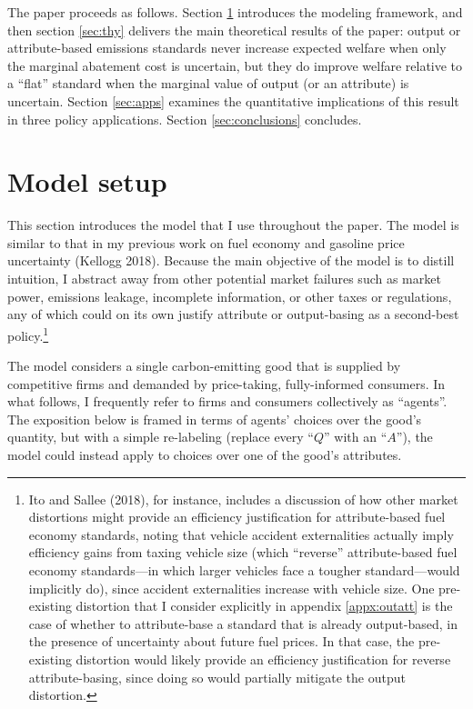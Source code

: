 \documentclass[12pt]{article}
\begin{document}
The paper proceeds as follows. Section \ref{sec:setup} introduces the modeling framework, and then section \ref{sec:thy} delivers the main theoretical results of the paper: output or attribute-based emissions standards never increase expected welfare when only the marginal abatement cost is uncertain, but they do improve welfare relative to a ``flat'' standard when the marginal value of output (or an attribute) is uncertain. Section \ref{sec:apps} examines the quantitative implications of this result in three policy applications. Section \ref{sec:conclusions} concludes.


\section{Model setup} \label{sec:setup}

This section introduces the model that I use throughout the paper. The model is similar to that in my previous work on fuel economy and gasoline price uncertainty (Kellogg 2018). Because the main objective of the model is to distill intuition, I abstract away from other potential market failures such as market power, emissions leakage, incomplete information, or other taxes or regulations, any of which could on its own justify attribute or output-basing as a second-best policy.\footnote{Ito and Sallee (2018), for instance, includes a discussion of how other market distortions might provide an efficiency justification for attribute-based fuel economy standards, noting that vehicle accident externalities actually imply efficiency gains from taxing vehicle size (which ``reverse'' attribute-based fuel economy standards---in which larger vehicles face a tougher standard---would implicitly do), since accident externalities increase with vehicle size. One pre-existing distortion that I consider explicitly in appendix \ref{appx:outatt} is the case of whether to attribute-base a standard that is already output-based, in the presence of uncertainty about future fuel prices. In that case, the pre-existing distortion would likely provide an efficiency justification for reverse attribute-basing, since doing so would partially mitigate the output distortion.}

The model considers a single carbon-emitting good that is supplied by competitive firms and demanded by price-taking, fully-informed consumers. In what follows, I frequently refer to firms and consumers collectively as ``agents''. The exposition below is framed in terms of agents' choices over the good's quantity, but with a simple re-labeling (replace every ``$Q$'' with an ``$A$''), the model could instead apply to choices over one of the good's attributes.
\end{document}
